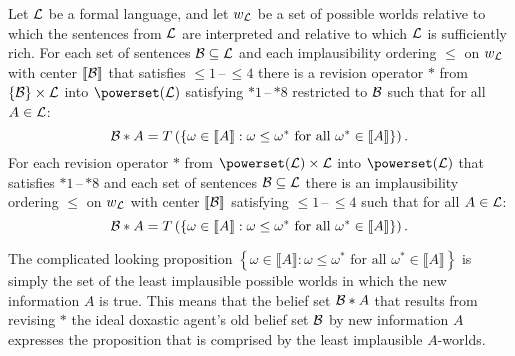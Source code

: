\begin{theorem}\label{th3}
Let $\cal L$ be a formal language, and let $w_{\cal L}$ be a set of possible worlds relative to which the sentences from $\cal L$ are interpreted and relative to which $\cal L$ is sufficiently rich. For each set of sentences $\cal B\subseteq L$ and each implausibility ordering $\leq$ on $w_{\cal L}$ with center $\llbracket\cal B\rrbracket$ that satisfies $\leq\!\!1$\,--\,$\leq\!\!4$ there is a revision operator $*$ from $\left\{\cal B\right\}\times\cal L$ into $\powerset\!\left(\cal L\right)$ satisfying $*1$\,--\,$*8$ restricted to $\cal B$ such that for all $A\in\cal L$:
$$\begin{cal}B\end{cal}*A=T\left(\left\{\omega\in\llbracket A\rrbracket:\omega\leq\omega^*\mbox{ for all }\omega^*\in\llbracket A\rrbracket\right\}\right).$$
For each revision operator $*$ from $\powerset\!\left(\cal L\right)\times\cal L$ into $\powerset\!\left(\cal L\right)$ that satisfies $*1$\,--\,$*8$ and each set of sentences $\cal B\subseteq L$ there is an implausibility ordering $\leq$ on $w_{\cal L}$ with center $\llbracket\cal B\rrbracket$ satisfying $\leq\!\!1$\,--\,$\leq\!\!4$ such that for all $A\in\cal L$:
$$\begin{cal}B\end{cal}*A=T\left(\left\{\omega\in\llbracket A\rrbracket:\omega\leq\omega^*\mbox{ for all }\omega^*\in\llbracket A\rrbracket\right\}\right).$$
\end{theorem}
The complicated looking proposition $\left\{\omega\in\llbracket A\rrbracket:\omega\leq\omega^*\mbox{ for all }\omega^*\in\llbracket A\rrbracket\right\}$ is simply the set of the least implausible possible worlds in which the new information $A$ is true. This means that the belief set $\begin{cal}B\end{cal}*A$ that results from revising $*$ the ideal doxastic agent's old belief set $\cal B$ by new information $A$ expresses the proposition that is comprised by the least implausible $A$-worlds.

